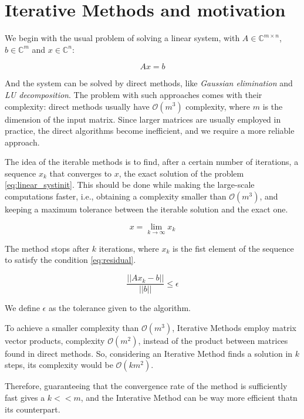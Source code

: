 \section{Iterative Methods and motivation}

We begin with the usual problem of solving a linear system, with $A \in \mathbb{C}^{m \times n}$, $b \in \mathbb{C}^{m}$ and $x\in \mathbb{C}^{n}$:

\begin{equation}\label{eq:linear_systinit}
    Ax=b
\end{equation}

And the system can be solved by direct methods, like \textit{Gaussian elimination} and \textit{LU decomposition}. The problem with such approaches comes with their complexity: direct methods usually have $\mathcal{O}(m^{3})$ complexity, where $m$ is the dimension of the input matrix. Since larger matrices are usually employed in practice, the direct algorithms become inefficient, and we require a more reliable approach.


The idea of the iterable methods is to find, after a certain number of iterations, a sequence ${x_{k}}$ that converges to $x$, the exact solution of the problem \ref{eq:linear_systinit}. This should be done while making the large-scale computations faster, i.e., obtaining a complexity smaller than $\mathcal{O}(m^{3})$, and keeping a maximum tolerance between the iterable solution and the exact one.


\begin{equation}\label{eq:suite}
    x = \lim_{k \to \infty} x_{k}
\end{equation}


The method stops after $k$ iterations, where $x_{k}$ is the fist element of the sequence to satisfy the condition \ref{eq:residual}.

\begin{equation}\label{eq:residual}
    \frac{||Ax_{k} - b||}{||b||} \leq \epsilon
\end{equation}

We define $\epsilon$ as the tolerance given to the algorithm.

To achieve a smaller complexity than $\mathcal{O}(m^{3})$, Iterative Methods employ matrix vector products, complexity $\mathcal{O}(m^{2})$, instead of the product between matrices found in direct methods. So, considering an Iterative Method finds a solution in $k$ steps, its complexity would be $\mathcal{O}(km^{2})$.

Therefore, guaranteeing that the convergence rate of the method is sufficiently fast gives a $k << m$, and the Interative Method can be way more efficient thatn its counterpart.

